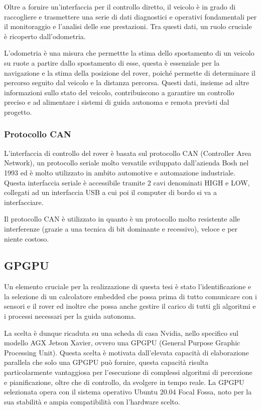 \noindent Oltre a fornire un'interfaccia per il controllo diretto, il veicolo è in grado di raccogliere e trasmettere una serie di dati diagnostici e operativi fondamentali per il monitoraggio e l'analisi delle sue prestazioni. Tra questi dati, un ruolo cruciale è ricoperto dall'odometria. 

\noindent L'odometria è una misura che permettte la stima dello spostamento di un veicolo su ruote a partire dallo spostamento di esse, questa è essenziale per la navigazione e la stima della posizione del rover, poiché permette di determinare il percorso seguito dal veicolo e la distanza percorsa. Questi dati, insieme ad altre informazioni sullo stato del veicolo, contribuiscono a garantire un controllo preciso e ad alimentare i sistemi di guida autonoma e remota previsti dal progetto.

\subsubsection{Protocollo CAN}
L'interfaccia di controllo del rover è basata sul protocollo CAN (Controller Area Network), un protocollo seriale molto versatile sviluppato dall'azienda Bosh nel 1993 ed è molto utilizzato in ambito automotive e automazione industriale. Questa interfaccia seriale è accessibile tramite 2 cavi denominati HIGH e LOW, collegati ad un interfaccia USB a cui poi il computer di bordo si va a interfacciare.

Il protocollo CAN è utilizzato in quanto è un protocollo molto resistente alle interferenze (grazie a una tecnica di bit dominante e recessivo), veloce e per niente costoso.  

\subsection{GPGPU}
Un elemento cruciale per la realizzazione di questa tesi è stato l'identificazione e la selezione di un calcolatore embedded che possa prima di tutto comunicare con i sensori e il rover ed inoltre che possa anche gestire il carico di tutti gli algoritmi e i processi necessari per la guida autonoma.

\noindent La scelta è dunque ricaduta su una scheda di casa Nvidia, nello specifico sul modello AGX Jetson Xavier, ovvero una GPGPU (General Purpose Graphic Processing Unit). Questa scelta è motivata dall'elevata capacità di elaborazione parallela che solo una GPGPU può fornire, questa capacità risulta particolarmente vantaggiosa per l'esecuzione di complessi algoritmi di percezione e pianificazione, oltre che di controllo, da svolgere in tempo reale. La GPGPU selezionata opera con il sistema operativo Ubuntu 20.04 Focal Fossa, noto per la sua stabilità e ampia compatibilità con l'hardware scelto.


